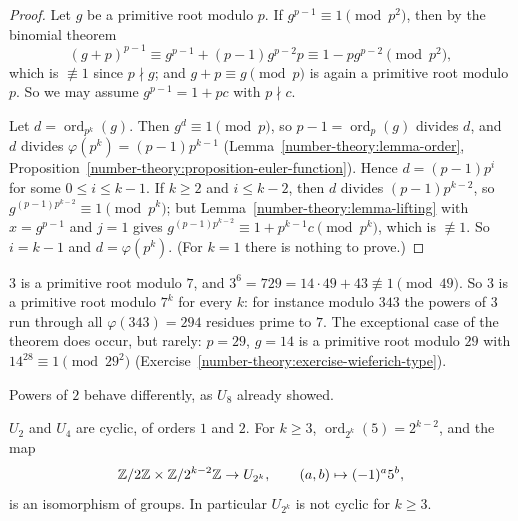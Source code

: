 \begin{proof}
Let $g$ be a primitive root modulo $p$. If $g^{p-1} \equiv 1 \pmod{p^2}$, then by the binomial theorem
\[
(g + p)^{p-1} \equiv g^{p-1} + (p - 1)g^{p-2}p \equiv 1 - pg^{p-2} \pmod{p^2},
\]
which is $\not\equiv 1$ since $p \nmid g$; and $g + p \equiv g \pmod p$ is again a primitive root modulo $p$. So we may assume $g^{p-1} = 1 + pc$ with $p \nmid c$.

Let $d = \operatorname{ord}_{p^k}(g)$. Then $g^d \equiv 1 \pmod p$, so $p - 1 = \operatorname{ord}_p(g)$ divides $d$, and $d$ divides $\varphi(p^k) = (p - 1)p^{k-1}$
(Lemma~\ref{number-theory:lemma-order}, Proposition~\ref{number-theory:proposition-euler-function}). Hence $d = (p - 1)p^i$ for some $0 \leq i \leq k - 1$. If $k \geq 2$ and $i \leq k - 2$, then $d$ divides
$(p - 1)p^{k-2}$, so $g^{(p-1)p^{k-2}} \equiv 1 \pmod{p^k}$; but Lemma~\ref{number-theory:lemma-lifting} with $x = g^{p-1}$ and $j = 1$ gives $g^{(p-1)p^{k-2}} \equiv 1 + p^{k-1}c \pmod{p^k}$, which is
$\not\equiv 1$. So $i = k - 1$ and $d = \varphi(p^k)$. (For $k = 1$ there is nothing to prove.)
\end{proof}

\begin{example}\label{number-theory:example-primitive-root-power}
$3$ is a primitive root modulo $7$, and $3^6 = 729 = 14 \cdot 49 + 43 \not\equiv 1 \pmod{49}$. So $3$ is a primitive root modulo $7^k$ for every $k$: for instance modulo $343$ the powers of $3$ run through
all $\varphi(343) = 294$ residues prime to $7$. The exceptional case of the theorem does occur, but rarely: $p = 29$, $g = 14$ is a primitive root modulo $29$ with $14^{28} \equiv 1 \pmod{29^2}$
(Exercise~\ref{number-theory:exercise-wieferich-type}).
\end{example}

Powers of $2$ behave differently, as $U_8$ already showed.

\begin{theorem}\label{number-theory:theorem-units-two-power}
$U_2$ and $U_4$ are cyclic, of orders $1$ and $2$. For $k \geq 3$, $\operatorname{ord}_{2^k}(5) = 2^{k-2}$, and the map
\[
\mathbb{Z}/2\mathbb{Z} \times \mathbb{Z}/2^{k-2}\mathbb{Z} \to U_{2^k}, \qquad (a, b) \mapsto (-1)^a5^b,
\]
is an isomorphism of groups. In particular $U_{2^k}$ is not cyclic for $k \geq 3$.
\end{theorem}

